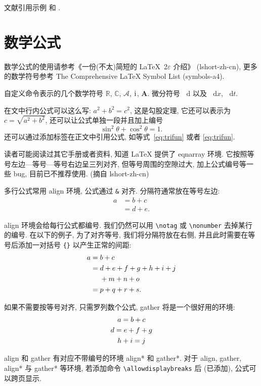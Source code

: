 \documentclass[openany,twoside,12pt]{book}
\theoremstyle{plain}
\newcommand{\dif}{\mathop{}\!\mathrm{d}}
\newcommand{\CC}{\ensuremath{\mathbb{C}}}
\newcommand{\RR}{\ensuremath{\mathbb{R}}}
\newcommand{\dx}[1][x]{\mathop{}\!\mathrm{d}#1}
\newcommand{\ii}{\mathrm{i}\mkern1mu} %
\newcommand{\A}{\mathcal{A}}
\newcommand{\bA}{\boldsymbol{A}}
\begin{document}
文献引用示例 \cite{LiLiu1997} 和 \cite{Adams2003,Shen1994}.


\section{数学公式}

数学公式的使用请参考《一份(不太)简短的 \LaTeX~2$\varepsilon$ 介绍》 (lshort-zh-cn), 更多的数学符号参考 The Comprehensive LaTeX Symbol List (symbols-a4).

自定义命令表示的几个数学符号 $\RR$, $\CC$, $\A$, $\ii$, $\bA$. 微分符号 $\dif$ 以及 $\dx$, $\dx[t]$.

在文中行内公式可以这么写: $a^2+b^2=c^2$, 这是勾股定理, 它还可以表示为 $c=\sqrt{a^2+b^2}$, 还可以让公式单独一段并且加上编号
\begin{equation}\label{eq:trifun}
\sin^2{\theta}+\cos^2{\theta}=1.
\end{equation}
还可以通过添加标签在正文中引用公式, 如等式~\eqref{eq:trifun} 或者 \ref{eq:trifun}.

读者可能阅读过其它手册或者资料, 知道 LaTeX 提供了 eqnarray 环境. 它按照等号左边—等号—等号右边呈三列对齐, 但等号周围的空隙过大, 加上公式编号等一些 bug, 目前已不推荐使用. (摘自 lshort-zh-cn)

多行公式常用 align 环境, 公式通过 \verb|&| 对齐. 分隔符通常放在等号左边:
\begin{align}
a & = b + c \\
& = d + e.
\end{align}

align 环境会给每行公式都编号. 我们仍然可以用 \verb|\notag| 或 \verb|\nonumber| 去掉某行的编号. 在以下的例子,
为了对齐等号, 我们将分隔符放在右侧, 并且此时需要在等号后添加一对括号 \verb|{}| 以产生正常的间距:
\begin{align}
a ={} & b + c \\
={} & d + e + f + g + h + i + j \notag \\
& + m + n + o \\
={} & p + q + r + s.
\end{align}

如果不需要按等号对齐, 只需罗列数个公式, gather 将是一个很好用的环境:
\begin{gather}
a = b + c \\
d = e + f + g \notag \\
h + i = j
\end{gather}

align 和 gather 有对应不带编号的环境 align* 和 gather*.
对于 align, gather, align* 与 gather* 等环境, 若添加命令 \verb|\allowdisplaybreaks| 后 (已添加), 公式可以跨页显示.
\end{document}

